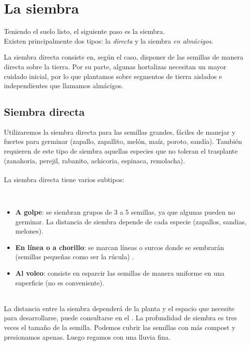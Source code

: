\documentclass[../main.tex]{subfiles}
\begin{document}
\section{La siembra}

Teniendo el suelo listo, el siguiente paso es la siembra. \\ 

Existen principalmente dos tipos: la \emph{directa} y la siembra \emph{en almácigos}.

La siembra directa consiste en, según el caso, disponer de las semillas de manera directa sobre la tierra. Por su parte, algunas hortalizas necesitan un mayor cuidado inicial, por lo que plantamos sobre segmentos de tierra aislados e independientes que llamamos almácigos.
 
\subsection{Siembra directa}

Utilizaremos la siembra directa para las semillas grandes, fáciles de manejar y fuertes para germinar (zapallo, zapallito, melón, maíz, poroto, sandía). También requieren de este tipo de siembra aquellas especies que no toleran el trasplante (zanahoria, perejil, rabanito, achicoria, espinaca, remolacha).\\

\hfill\\

La siembra directa tiene varios subtipos:

\hfill\\

\begin{itemize}
    \item \textbf{A golpe}: se siembran grupos de 3 a 5 semillas, ya que algunas pueden no germinar. La distancia de siembra depende de cada especie (zapallos, sandias, melones).
    \item \textbf{En línea o a chorillo}: se marcan líneas o surcos donde se sembrarán (semillas pequeñas como ser la rúcula) .
    \item \textbf{Al voleo}: consiste en esparcir las semillas de manera uniforme en una superficie (no es conveniente).
\end{itemize}

\hfill\\

La distancia entre la siembra dependerá de la planta y el espacio que necesite para desarrollarse, puede consultarse en el . La profundidad de siembra es tres veces el tamaño de la semilla. Podemos cubrir las semillas con más compost y presionamos apenas. Luego regamos con una lluvia fina.
\end{document}
